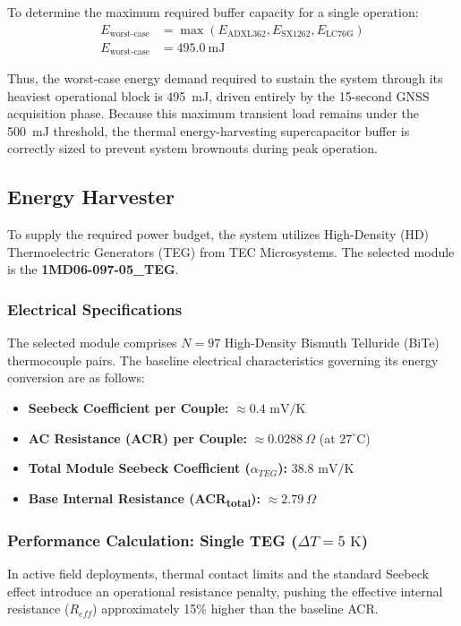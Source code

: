 \documentclass[paper=a4]{article}
\begin{document}
To determine the maximum required buffer capacity for a single operation:
\begin{align*}
    E_{\text{worst-case}} &= \max(E_{\text{ADXL362}}, E_{\text{SX1262}}, E_{\text{LC76G}}) \\
    E_{\text{worst-case}} &= \SI{495.0}{\milli\joule}
\end{align*}

Thus, the worst-case energy demand required to sustain the system through its heaviest operational block is \SI{495}{\milli\joule}, driven entirely by the 15-second GNSS acquisition phase. Because this maximum transient load remains under the \SI{500}{\milli\joule} threshold, the thermal energy-harvesting supercapacitor buffer is correctly sized to prevent system brownouts during peak operation.

\subsection{Energy Harvester}
To supply the required power budget, the system utilizes High-Density (HD) Thermoelectric Generators (TEG) from TEC Microsystems. The selected module is the \textbf{1MD06-097-05\_TEG}.

\subsubsection*{Electrical Specifications}
The selected module comprises $N = 97$ High-Density Bismuth Telluride (BiTe) thermocouple pairs. The baseline electrical characteristics governing its energy conversion are as follows:
\begin{itemize}
    \item \textbf{Seebeck Coefficient per Couple:} $\approx 0.4\text{ mV/K}$
    \item \textbf{AC Resistance (ACR) per Couple:} $\approx 0.0288\ \Omega$ (at $27^\circ\text{C}$)
    \item \textbf{Total Module Seebeck Coefficient ($\alpha_{TEG}$):} $38.8\text{ mV/K}$
    \item \textbf{Base Internal Resistance (ACR\textsubscript{total}):} $\approx 2.79\ \Omega$
\end{itemize}

\subsubsection*{Performance Calculation: Single TEG ($\Delta T = 5\text{ K}$)}
In active field deployments, thermal contact limits and the standard Seebeck effect introduce an operational resistance penalty, pushing the effective internal resistance ($R_{eff}$) approximately 15\% higher than the baseline ACR.
\end{document}
